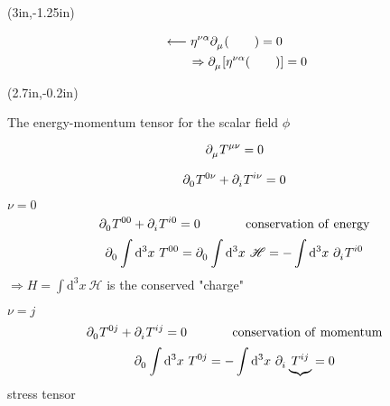 \documentclass{article}
\begin{document}
{%
\begin{textblock*}{2in}(3in,-1.25in)%
\begin{minipage}[h!]{2in}
    \begin{align*}
        &\longleftarrow \tensor{\eta}{^\nu^\alpha} \tensor{\partial}{_\mu} (\qquad) = 0 \\
        &\qquad \Rightarrow \tensor{\partial}{_\mu} [ \tensor{\eta}{^\nu^\alpha} (\qquad) ] = 0
    \end{align*}
\end{minipage}%
\end{textblock*}%
}
{%
\begin{textblock*}{2in}(2.7in,-0.2in)%
\begin{minipage}[h!]{2in}
    \noindent The energy-momentum tensor for the scalar field $\phi$
\end{minipage}%
\end{textblock*}%
}


\newpage

\begin{equation*}
    \tensor{\partial}{_\mu} \tensor{T}{^\mu^\nu} = 0
\end{equation*}

\begin{equation*}
    \tensor{\partial}{_0} \tensor{T}{^0^\nu} + \tensor{\partial}{_i} \tensor{T}{^i^\nu} = 0
\end{equation*}

\noindent \underline{$\nu = 0$}
\begin{equation*}
    \tensor{\partial}{_0} \tensor{T}{^0^0} + \tensor{\partial}{_i} \tensor{T}{^i^0} = 0 \hspace{0.5in} \mathrm{conservation} ~ \mathrm{of} ~ \mathrm{energy}
\end{equation*}
\begin{equation*}
    \tensor{\partial}{_0} \int \mathrm{d}^3 x~ \tensor{T}{^0^0} = \tensor{\partial}{_0} \int \mathrm{d}^3 x~ \mathscr{H} = - \int \mathrm{d}^3 x~ \tensor{\partial}{_i} \tensor{T}{^i^0}
\end{equation*}
$\Rightarrow H = \int \mathrm{d}^3 x~ \mathscr{H}$ is the conserved "charge"

\noindent \underline{$\nu = j$}
\begin{equation*}
    \tensor{\partial}{_0} \tensor{T}{^0^j} + \tensor{\partial}{_i} \tensor{T}{^i^j} = 0 \hspace{0.5in} \mathrm{conservation} ~ \mathrm{of} ~ \mathrm{momentum}
\end{equation*}
\begin{equation*}
    \tensor{\partial}{_0} \int \mathrm{d}^3 x~ \tensor{T}{^0^j} =  - \int \mathrm{d}^3 x~ \tensor{\partial}{_i} \underbrace{ \tensor{T}{^i^j} } = 0
\end{equation*}
\hspace*{2.7in} {\small stress tensor}
\end{document}

